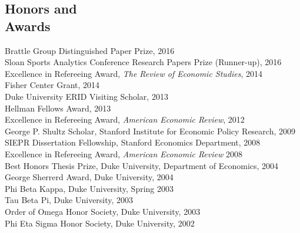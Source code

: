 \documentclass[margin,line,11pt]{resume}
\begin{document}
\begin{resume}
    \section{\mysidestyle Honors and\\Awards}
    Brattle Group Distinguished Paper Prize, 2016 \\
    Sloan Sports Analytics Conference Research Papers Prize (Runner-up), 2016\\
       Excellence in Refereeing Award, \emph{The Review of Economic Studies}, 2014 \\
    Fisher Center Grant, 2014 \\
    Duke University ERID Visiting Scholar, 2013 \\
    Hellman Fellows Award, 2013 \\
    Excellence in Refereeing Award, \emph{American Economic Review}, 2012 \\
    George P. Shultz Scholar, Stanford Institute for Economic Policy Research, 2009 \\
    SIEPR Dissertation Fellowship, Stanford Economics Department, 2008 \\
    Excellence in Refereeing Award, \emph{American Economic Review} 2008 \\
    Best Honors Thesis Prize, Duke University, Department of Economics, 2004 \\
    George Sherrerd Award, Duke University, 2004\\
    Phi Beta Kappa, Duke University, Spring 2003 \\
    Tau Beta Pi, Duke University, 2003 \\
    Order of Omega Honor Society, Duke University, 2003 \\
    Phi Eta Sigma Honor Society, Duke University, 2002 \\



\end{resume}
\end{document}
